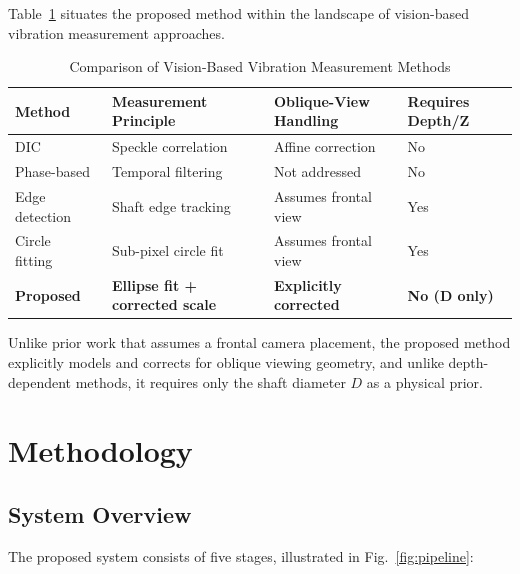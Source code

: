 \documentclass[journal]{IEEEtran}
\begin{document}
Table~\ref{tab:lit_comp} situates the proposed method within the landscape of
vision-based vibration measurement approaches.

\begin{table}[!t]
\centering
\caption{Comparison of Vision-Based Vibration Measurement Methods}
\label{tab:lit_comp}
\footnotesize
\begin{tabular}{p{2.2cm}p{1.8cm}p{1.2cm}p{1.2cm}}
\toprule
Method & Measurement Principle & Oblique-View Handling & Requires Depth/Z\\
\midrule
DIC~\cite{pan2009} & Speckle correlation & Affine correction & No \\
Phase-based~\cite{wadhwa2013} & Temporal filtering & Not addressed & No \\
Edge detection~\cite{guo2016} & Shaft edge tracking & Assumes frontal view & Yes \\
Circle fitting~\cite{wang2019} & Sub-pixel circle fit & Assumes frontal view & Yes \\
\textbf{Proposed} & \textbf{Ellipse fit + corrected scale} & \textbf{Explicitly corrected} & \textbf{No (D only)} \\
\bottomrule
\end{tabular}
\end{table}

Unlike prior work that assumes a frontal camera placement, the proposed method
explicitly models and corrects for oblique viewing geometry, and unlike
depth-dependent methods, it requires only the shaft diameter $D$ as a physical
prior.

\section{Methodology}

\subsection{System Overview}

The proposed system consists of five stages, illustrated in Fig.~\ref{fig:pipeline}:
\end{document}
